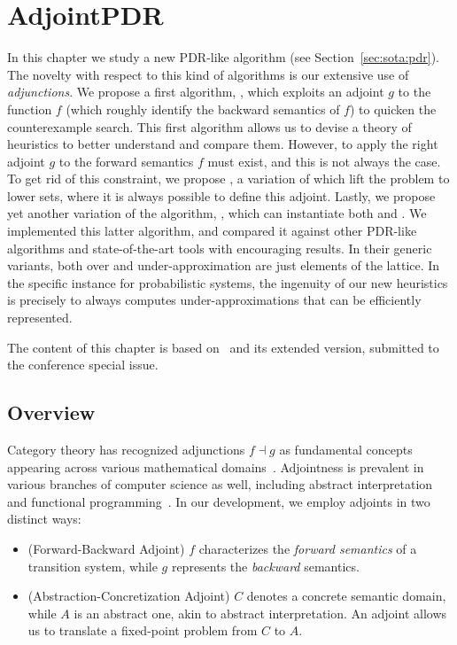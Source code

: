 
\chapter{AdjointPDR}\label{ch:pdr}
In this chapter we study a new PDR-like algorithm (see Section~\ref{sec:sota:pdr}).
The novelty with respect to this kind of algorithms is our extensive use of \emph{adjunctions}. We propose a first algorithm, \APDR{}, which exploits an adjoint $g$ to the function $f$ (which roughly identify the backward semantics of $f$) to quicken the counterexample search. This first algorithm allows us to devise a theory of heuristics to better understand and compare them.
However, to apply \APDR{} the right adjoint $g$ to the forward semantics $f$ must exist, and this is not always the case. To get rid of this constraint, we propose \ADPDR{}, a variation of \APDR{} which lift the problem to lower sets, where it is always possible to define this adjoint.
Lastly, we propose yet another variation of the algorithm, \APDRAI{}, which can instantiate both \APDR{} and \ADPDR{}. We implemented this latter algorithm, and compared it against other PDR-like algorithms and state-of-the-art tools with encouraging results.
In their generic variants, both over and under-approximation are just elements of the lattice. In the specific instance for probabilistic systems, the ingenuity of our new heuristics is precisely to always computes under-approximations that can be efficiently represented.

The content of this chapter is based on~\cite{KABBGH23} and its extended version, submitted to the conference special issue.

\section{Overview}
Category theory has recognized adjunctions $f \dashv g$ as fundamental concepts appearing across various mathematical domains~\cite{Lawvere69}. Adjointness is prevalent in various branches of computer science as well, including abstract interpretation and functional programming~\cite{Levy2004}. In our development, we employ adjoints in two distinct ways:
\begin{itemize}
	\item (Forward-Backward Adjoint) $f$ characterizes the \emph{forward semantics} of a transition system, while $g$ represents the \emph{backward} semantics.
	\item (Abstraction-Concretization Adjoint) $C$ denotes a concrete semantic domain, while $A$ is an abstract one, akin to abstract interpretation. An adjoint allows us to translate a fixed-point problem from $C$ to $A$.
\end{itemize}

